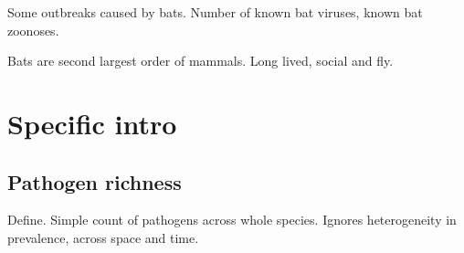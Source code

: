 
Some outbreaks caused by bats.
Number of known bat viruses, known bat zoonoses.

Bats are second largest order of mammals.
Long lived, social and fly.


\section{Specific  intro}
\subsection{Pathogen richness}

Define.
Simple count of pathogens across whole species.
Ignores heterogeneity in prevalence, across space and time.











